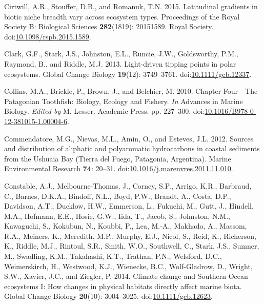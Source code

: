 \documentclass[
]{article}
\newlength{\cslhangindent}
\newenvironment{CSLReferences}[2] %
 {\begin{list}{}{%
  \setlength{\itemindent}{0pt}
  \setlength{\leftmargin}{0pt}
  \setlength{\parsep}{0pt}
  \ifodd #1
   \setlength{\leftmargin}{\cslhangindent}
   \setlength{\itemindent}{-1\cslhangindent}
  \fi
  \setlength{\itemsep}{#2\baselineskip}}}
 {\end{list}}
\begin{document}
\begin{CSLReferences}{1}{0}
Cirtwill, A.R., Stouffer, D.B., and Romanuk, T.N. 2015. Latitudinal
gradients in biotic niche breadth vary across ecosystem types.
Proceedings of the Royal Society B: Biological Sciences
\textbf{282}(1819): 20151589. Royal Society.
doi:\href{https://doi.org/10.1098/rspb.2015.1589}{10.1098/rspb.2015.1589}.

Clark, G.F., Stark, J.S., Johnston, E.L., Runcie, J.W., Goldsworthy,
P.M., Raymond, B., and Riddle, M.J. 2013. Light-driven tipping points in
polar ecosystems. Global Change Biology \textbf{19}(12): 3749--3761.
doi:\href{https://doi.org/10.1111/gcb.12337}{10.1111/gcb.12337}.

Collins, M.A., Brickle, P., Brown, J., and Belchier, M. 2010. Chapter
{Four} - {The Patagonian Toothfish}: {Biology}, {Ecology} and {Fishery}.
\emph{In} Advances in {Marine Biology}. \emph{Edited by} M. Lesser.
Academic Press. pp. 227--300.
doi:\href{https://doi.org/10.1016/B978-0-12-381015-1.00004-6}{10.1016/B978-0-12-381015-1.00004-6}.

Commendatore, M.G., Nievas, M.L., Amin, O., and Esteves, J.L. 2012.
Sources and distribution of aliphatic and polyaromatic hydrocarbons in
coastal sediments from the {Ushuaia Bay} ({Tierra} del {Fuego},
{Patagonia}, {Argentina}). Marine Environmental Research \textbf{74}:
20--31.
doi:\href{https://doi.org/10.1016/j.marenvres.2011.11.010}{10.1016/j.marenvres.2011.11.010}.

Constable, A.J., Melbourne-Thomas, J., Corney, S.P., Arrigo, K.R.,
Barbraud, C., Barnes, D.K.A., Bindoff, N.L., Boyd, P.W., Brandt, A.,
Costa, D.P., Davidson, A.T., Ducklow, H.W., Emmerson, L., Fukuchi, M.,
Gutt, J., Hindell, M.A., Hofmann, E.E., Hosie, G.W., Iida, T., Jacob,
S., Johnston, N.M., Kawaguchi, S., Kokubun, N., Koubbi, P., Lea, M.-A.,
Makhado, A., Massom, R.A., Meiners, K., Meredith, M.P., Murphy, E.J.,
Nicol, S., Reid, K., Richerson, K., Riddle, M.J., Rintoul, S.R., Smith,
W.O., Southwell, C., Stark, J.S., Sumner, M., Swadling, K.M., Takahashi,
K.T., Trathan, P.N., Welsford, D.C., Weimerskirch, H., Westwood, K.J.,
Wienecke, B.C., Wolf-Gladrow, D., Wright, S.W., Xavier, J.C., and
Ziegler, P. 2014. Climate change and {Southern Ocean} ecosystems {I}:
How changes in physical habitats directly affect marine biota. Global
Change Biology \textbf{20}(10): 3004--3025.
doi:\href{https://doi.org/10.1111/gcb.12623}{10.1111/gcb.12623}.


\end{CSLReferences}
\end{document}
